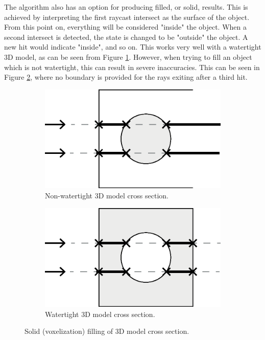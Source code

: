 The algorithm also has an option for producing filled, or solid, results. This is achieved by interpreting the first raycast intersect as the surface of the object. From this point on, everything will be considered "inside" the object. When a second intersect is detected, the state is changed to be "outside" the object. A new hit would indicate "inside", and so on. This works very well with a watertight 3D model, as can be seen from Figure \ref{fig:filling-non-watertight-model}. However, when trying to fill an object which is not watertight, this can result in severe inaccuracies. This can be seen in Figure \ref{fig:filling-watertight-model}, where no boundary is provided for the rays exiting after a third hit.
\begin{figure}[h]
    \centering
    \begin{subfigure}[b]{0.45\textwidth}
        \centering
        \includegraphics[width=\textwidth]{sections/methodology/figures/solid-non-watertight}
        \caption{Non-watertight 3D model cross section.}
        \label{fig:filling-non-watertight-model}
    \end{subfigure}
    \hfill
    \begin{subfigure}[b]{0.45\textwidth}
        \centering
        \includegraphics[width=\textwidth]{sections/methodology/figures/solid-watertight}
        \caption{Watertight 3D model cross section.}
        \label{fig:filling-watertight-model}
    \end{subfigure}
       \caption{Solid (voxelization) filling of 3D model cross section.}
       \label{fig:filling-3d-model}
\end{figure}

